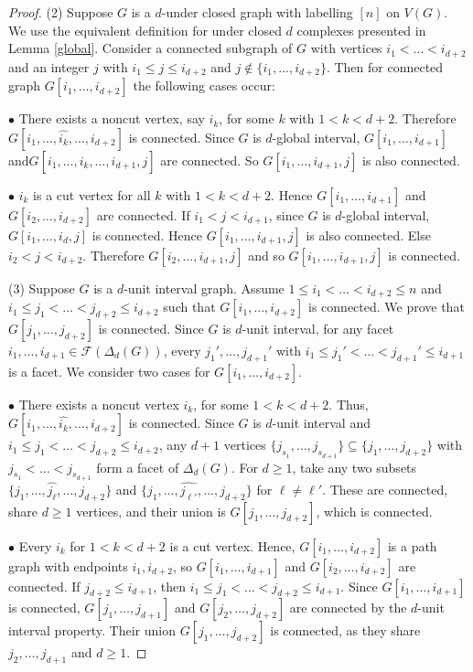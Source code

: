 \documentclass[12pt,reqno]{amsart}
\theoremstyle{plain}
\theoremstyle{definition}
\numberwithin{equation}{section}
\begin{document}
\begin{proof}
(2) Suppose $G$ is a $d$-under closed graph with labelling $[n]$ on $V(G)$. We use the equivalent definition for under closed $d$ complexes presented in Lemma \ref{global}. Consider a connected subgraph of $G$ with vertices $i_1<\dots < i_{d+2}$ and an integer $j$ with $i_1\leq j\leq i_{d+2}$ and $j\notin \{i_1, \dots , i_{d+2}\}$.  Then for connected graph $G[i_1, \dots , i_{d+2}]$ the following cases occur:

$\bullet$ There exists a noncut vertex, say $i_k$, for some $k$ with $1< k <d+2$.
Therefore $G[i_1, \dots , \widehat{i_k}, \dots , i_{d+2}]$ is connected. Since $G$ is $d$-global interval, $G[i_1, \dots , i_{d+1}]$ and\linebreak $G[i_1, \dots , \widehat{i_k}, \dots , i_{d+1}, j]$ are connected. So $G[i_1, \dots , i_{d+1}, j]$ is also connected.

$\bullet$ $i_k$ is a cut vertex for all $k$ with $1<k < d+2$. Hence $G[i_1, \dots , i_{d+1}]$ and $G[i_2, \dots , i_{d+2}]$ are connected. If $i_1<j<i_{d+1}$,  since $G$ is $d$-global interval, $G[i_1, \dots , i_d, j]$ is connected. Hence  $G[i_1, \dots , i_{d+1}, j]$ is also connected. Else $i_2<j<i_{d+2}$. Therefore $G[i_2, \dots , i_{d+1}, j]$ and so $G[i_1, \dots , i_{d+1},j]$ is connected.

(3) Suppose $G$ is a $d$-unit interval graph. Assume $1 \leq i_1 < \dots < i_{d+2} \leq n$ and $i_1 \leq j_1 < \dots < j_{d+2} \leq i_{d+2}$ such that $G[i_1, \dots, i_{d+2}]$ is connected. We prove that $G[j_1, \dots, j_{d+2}]$ is connected. Since $G$ is $d$-unit interval, for any facet ${i_1, \dots, i_{d+1}} \in \mathcal{F}(\Delta_d(G))$, every ${j_1', \dots, j_{d+1}'}$ with $i_1 \leq j_1' < \dots < j_{d+1}' \leq i_{d+1}$ is a facet. We consider two cases for $G[i_1, \dots, i_{d+2}]$.

$\bullet$ There exists a noncut vertex $i_k$, for some $1 < k < d+2$. Thus, $G[i_1, \dots, \widehat{i_k}, \dots, i_{d+2}]$ is connected. Since $G$ is $d$-unit interval and $i_1 \leq j_1 < \dots < j_{d+2} \leq i_{d+2}$, any $d+1$ vertices $\{j_{s_1}, \dots, j_{s_{d+1}}\} \subseteq \{j_1, \dots, j_{d+2}\}$ with $j_{s_1} < \dots < j_{s_{d+1}}$ form a facet of $\Delta_d(G)$. For $d \geq 1$, take any two subsets $\{j_1, \dots, \widehat{j_\ell}, \dots, j_{d+2}\}$ and $\{j_1, \dots, \widehat{j_{\ell'}}, \dots, j_{d+2}\}$ for $\ell \neq \ell'$. These are connected, share $d \geq 1$ vertices, and their union is $G[j_1, \dots, j_{d+2}]$, which is connected.

$\bullet$ Every $i_k$ for $1 < k < d+2$ is a cut vertex. Hence, $G[i_1, \dots, i_{d+2}]$ is a path graph with endpoints $i_1, i_{d+2}$, so $G[i_1, \dots, i_{d+1}]$ and $G[i_2, \dots, i_{d+2}]$ are connected. If $j_{d+2} \leq i_{d+1}$, then $i_1 \leq j_1 < \dots < j_{d+2} \leq i_{d+1}$. Since $G[i_1, \dots, i_{d+1}]$ is connected, $G[j_1, \dots, j_{d+1}]$  and $G[j_2, \dots, j_{d+2}]$ are connected by the $d$-unit interval property.  Their union $G[j_1, \dots, j_{d+2}]$ is connected, as they share $j_2, \dots, j_{d+1}$ and $d \geq 1$.


\end{proof}
\end{document}
